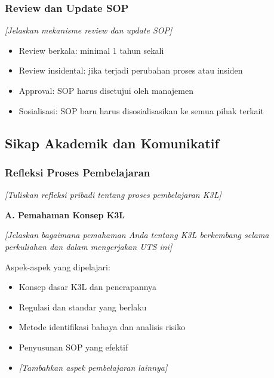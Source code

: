 \vspace{0.5cm}

\subsubsection{Review dan Update SOP}

\textit{[Jelaskan mekanisme review dan update SOP]}

\begin{itemize}
    \item Review berkala: minimal 1 tahun sekali
    \item Review insidental: jika terjadi perubahan proses atau insiden
    \item Approval: SOP harus disetujui oleh manajemen
    \item Sosialisasi: SOP baru harus disosialisasikan ke semua pihak terkait
\end{itemize}

\vspace{1cm}

\subsection{Sikap Akademik dan Komunikatif}
\label{subsec:sikap-akademik}


\subsubsection{Refleksi Proses Pembelajaran}

\textit{[Tuliskan refleksi pribadi tentang proses pembelajaran K3L]}

\textbf{A. Pemahaman Konsep K3L}

\textit{[Jelaskan bagaimana pemahaman Anda tentang K3L berkembang selama perkuliahan dan dalam mengerjakan UTS ini]}

Aspek-aspek yang dipelajari:
\begin{itemize}
    \item Konsep dasar K3L dan penerapannya
    \item Regulasi dan standar yang berlaku
    \item Metode identifikasi bahaya dan analisis risiko
    \item Penyusunan SOP yang efektif
    \item \textit{[Tambahkan aspek pembelajaran lainnya]}
\end{itemize}

